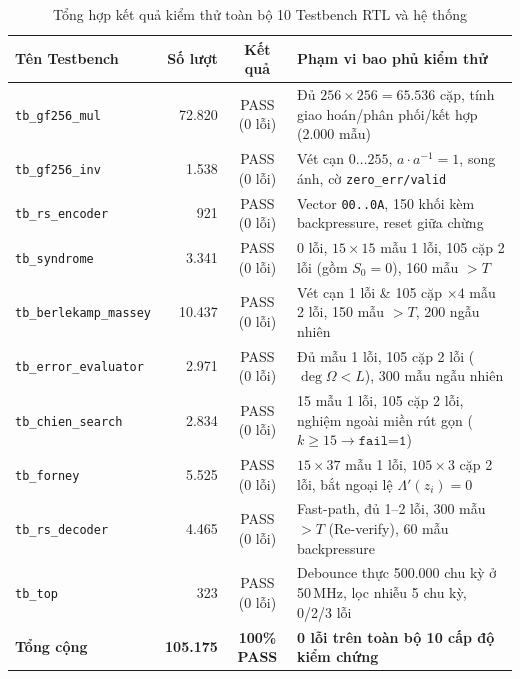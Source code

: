 \begin{table}[!htb]
    \centering
    \caption{Tổng hợp kết quả kiểm thử toàn bộ 10 Testbench RTL và hệ thống}
    \label{tab:tb-summary}
    \footnotesize
    \renewcommand{\arraystretch}{1.08}
    \begin{tabular}{l r c p{6.6cm}}
        \toprule
        \textbf{Tên Testbench} & \textbf{Số lượt} & \textbf{Kết quả} & \textbf{Phạm vi bao phủ kiểm thử} \\
        \midrule
        \texttt{tb\_gf256\_mul} & 72.820 & PASS (0 lỗi) & Đủ $256\times 256=65.536$ cặp, tính giao hoán/phân phối/kết hợp (2.000 mẫu) \\
        \texttt{tb\_gf256\_inv} & 1.538 & PASS (0 lỗi) & Vét cạn $0\dots 255$, $a\cdot a^{-1}=1$, song ánh, cờ \texttt{zero\_err/valid} \\
        \texttt{tb\_rs\_encoder} & 921 & PASS (0 lỗi) & Vector \texttt{00..0A}, 150 khối kèm backpressure, reset giữa chừng \\
        \texttt{tb\_syndrome} & 3.341 & PASS (0 lỗi) & 0 lỗi, $15\times 15$ mẫu 1 lỗi, 105 cặp 2 lỗi (gồm $S_0=0$), 160 mẫu $>T$ \\
        \texttt{tb\_berlekamp\_massey} & 10.437 & PASS (0 lỗi) & Vét cạn 1 lỗi \& 105 cặp $\times 4$ mẫu 2 lỗi, 150 mẫu $>T$, 200 ngẫu nhiên \\
        \texttt{tb\_error\_evaluator} & 2.971 & PASS (0 lỗi) & Đủ mẫu 1 lỗi, 105 cặp 2 lỗi ($\deg\Omega<L$), 300 mẫu ngẫu nhiên \\
        \texttt{tb\_chien\_search} & 2.834 & PASS (0 lỗi) & 15 mẫu 1 lỗi, 105 cặp 2 lỗi, nghiệm ngoài miền rút gọn ($k\ge 15\to\texttt{fail=1}$) \\
        \texttt{tb\_forney} & 5.525 & PASS (0 lỗi) & $15\times 37$ mẫu 1 lỗi, $105\times 3$ cặp 2 lỗi, bắt ngoại lệ $\Lambda'(z_i)=0$ \\
        \texttt{tb\_rs\_decoder} & 4.465 & PASS (0 lỗi) & Fast-path, đủ 1--2 lỗi, 300 mẫu $>T$ (Re-verify), 60 mẫu backpressure \\
        \texttt{tb\_top} & 323 & PASS (0 lỗi) & Debounce thực 500.000 chu kỳ ở 50\,MHz, lọc nhiễu 5 chu kỳ, 0/2/3 lỗi \\
        \midrule
        \textbf{Tổng cộng} & \textbf{105.175} & \textbf{100\% PASS} & \textbf{0 lỗi trên toàn bộ 10 cấp độ kiểm chứng} \\
        \bottomrule
    \end{tabular}
\end{table}

